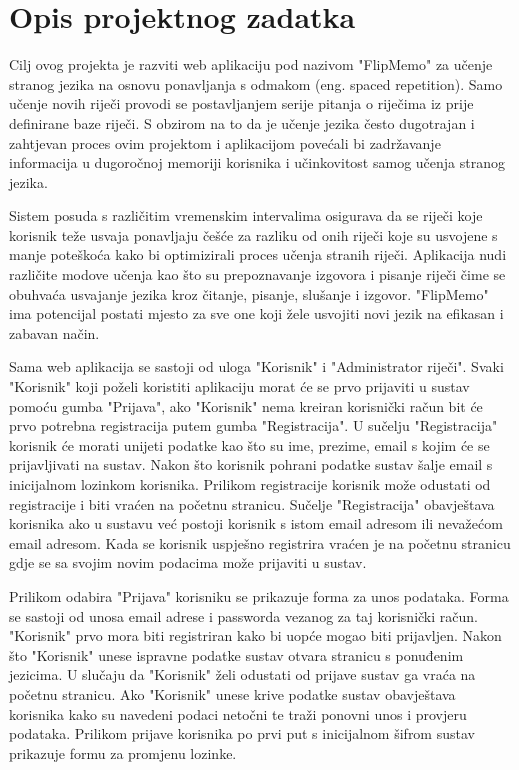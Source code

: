 \chapter{Opis projektnog zadatka}

Cilj ovog projekta je razviti web aplikaciju pod nazivom "FlipMemo" za učenje stranog jezika na osnovu ponavljanja s odmakom (eng. spaced repetition). Samo učenje novih riječi provodi se postavljanjem serije pitanja o riječima iz prije definirane baze riječi. S obzirom na to da je učenje jezika često dugotrajan i zahtjevan proces ovim projektom i aplikacijom povećali bi zadržavanje informacija u dugoročnoj memoriji korisnika i učinkovitost samog učenja stranog jezika.

Sistem posuda s različitim vremenskim intervalima osigurava da se riječi koje korisnik teže usvaja ponavljaju češće za razliku od onih riječi koje su usvojene s manje poteškoća kako bi optimizirali proces učenja stranih riječi. Aplikacija nudi različite modove učenja kao što su prepoznavanje izgovora i pisanje riječi čime se obuhvaća usvajanje jezika kroz čitanje, pisanje, slušanje i izgovor. "FlipMemo" ima potencijal postati mjesto za sve one koji žele usvojiti novi jezik na efikasan i zabavan način.

Sama web aplikacija se sastoji od uloga "Korisnik" i "Administrator riječi". Svaki "Korisnik" koji poželi koristiti aplikaciju morat će se prvo prijaviti u sustav pomoću  gumba "Prijava", ako "Korisnik" nema kreiran korisnički račun bit će prvo potrebna registracija putem gumba "Registracija". U sučelju "Registracija" korisnik će morati unijeti podatke kao što su ime, prezime, email s kojim će se prijavljivati na sustav. Nakon što korisnik pohrani podatke sustav šalje email s inicijalnom lozinkom korisnika. Prilikom registracije korisnik može odustati od registracije i biti vraćen na početnu stranicu. Sučelje "Registracija" obavještava korisnika ako u sustavu već postoji korisnik s istom email adresom ili nevažećom email adresom. Kada se korisnik uspješno registrira vraćen je na početnu stranicu gdje se sa svojim novim podacima može prijaviti u sustav.

Prilikom odabira "Prijava" korisniku se prikazuje forma za unos podataka. Forma se sastoji od unosa email adrese i passworda vezanog za taj korisnički račun. "Korisnik" prvo mora biti registriran kako bi uopće mogao biti prijavljen. Nakon što "Korisnik" unese ispravne podatke  sustav otvara stranicu s ponuđenim jezicima. U slučaju da "Korisnik" želi odustati od prijave sustav ga vraća na početnu stranicu. Ako "Korisnik" unese krive podatke sustav obavještava korisnika kako su navedeni podaci netočni te traži ponovni unos i provjeru podataka. Prilikom prijave korisnika po prvi put s inicijalnom šifrom sustav prikazuje formu za promjenu lozinke.

